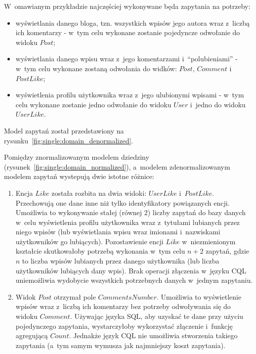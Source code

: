 W~omawianym przykładzie najczęściej wykonywane będa zapytania na potrzeby:

\begin{itemize}
 \item wyświetlania danego bloga, tzn. wszystkich wpisów jego autora wraz z~liczbą ich komentarzy - w~tym celu wykonane zostanie pojedyncze odwołanie do widoku $Post$;
 \item wyświetlania danego wpisu wraz z~jego komentarzami i~``polubieniami'' - w~tym celu wykonane zostaną odwołania do widków: $Post$, $Comment$ i~$PostLike$;
 \item wyświetlenia profilu użytkownika wraz z~jego ulubionymi wpisami - w~tym celu wykonane zostanie jedno odwołanie do widoku $User$ i~jedno do widoku $UserLike$.
\end{itemize}

Model zapytań został przedstawiony na rysunku~\ref{fig:single:domain_denormalized}.



Pomiędzy znormalizowanym modelem dziedziny (rysunek~\ref{fig:single:domain_normalized}), a~modelem zdenormalizowanym modelem zapytań wystepują dwie istotne różnice:

\begin{enumerate}
 \item Encja $Like$ została rozbita na dwia widoki: $UserLike$ i~$PostLike$.
 Przechowują one dane inne niż tylko identyfikatory powiązanych encji.
 Umożliwia to wykonywanie stałej (równej $2$) liczby zapytań do bazy danych w~celu wyświetlenia profilu użytkownika wraz z~tytułami lubianych przez niego wpisów (lub wyświetlania wpisu wraz imionami i~nazwiskami użytkowników go lubiących).
 Pozostawienie encji $Like$ w~niezmienionym kształcie skutkowałoby potrzebą wykonania w~tym celu $n + 2$ zapytań, gdzie $n$ to liczba wpisów lubianych przez danego użytkownika (lub liczba użytkowników lubiących dany wpis).
 Brak operacji złączenia w~języku CQL uniemożliwia wydobycie wszystkich potrzebnych danych w~jednym zapytaniu.
 \item Widok $Post$ otrzymał pole $CommentsNumber$.
 Umożliwia to wyświetlenie wpisów wraz z~liczbą ich komentarzy bez potrzeby odwoływania się do widoku $Comment$.
 Używając języka SQL, aby uzyskać te dane przy użyciu pojedynczego zapytania, wystarczyłoby wykorzystać złączenie i~funkcję agregującą $Count$.
 Jednakże język CQL nie umożliwia stworzenia takiego zapytania (a~tym samym wymusza jak najmniejszy koszt zapytania).
\end{enumerate}



